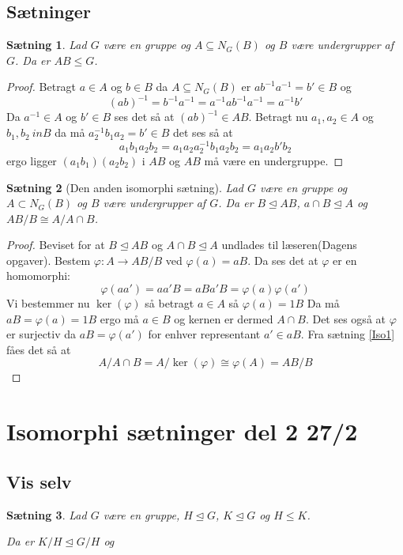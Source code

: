 \documentclass{article}
\newcommand{\inv}{^{-1}}
\newcommand{\too}{\rightarrow}
\newtheorem{setn}{Sætning}
\begin{document}
		\subsection*{Sætninger}
		\begin{setn}
			Lad $G$ være en gruppe og $A \subseteq N_G(B)$ og $B$ være undergrupper af $G$.
			Da er $AB \le G$.
		\end{setn}
		\begin{proof}
			Betragt $a \in A$ og $b \in B$ da $A \subseteq N_G(B)$ er $ab\inv a\inv = b' \in B$ og
			$$(ab)\inv = b\inv a\inv = a\inv a b \inv a \inv = a \inv b'$$
			Da $a\inv \in A$ og $b' \in B$ ses det så at $(ab)\inv \in AB$. Betragt nu
			$a_1, a_2 \in A$ og $b_1, b_2 \ in B$ da må $a_2\inv b_1 a_2 = b' \in B$ det ses så at
			$$a_1b_1a_2b_2 = a_1a_2a_2\inv b_1a_2b_2 = a_1a_2b'b_2$$
			ergo ligger $(a_1b_1)(a_2b_2)$ i $AB$ og $AB$ må være en undergruppe.
		\end{proof}
		\begin{setn}[Den anden isomorphi sætning]
			Lad $G$ være en gruppe og $A \subset N_G(B)$ og $B$ være undergrupper af $G$.
			Da er $B \unlhd AB$, $a\cap B \unlhd A$ og $AB/B \cong A/A\cap B$.
		\end{setn}
		\begin{proof}
			Beviset for at $B \unlhd AB$ og $A\cap B \unlhd A$ undlades til læseren(Dagens opgaver).
			Bestem $\varphi: A \too AB/B$ ved $\varphi(a) = aB$. Da ses det at $\varphi$ er en
			homomorphi:
			$$\varphi(aa') = aa'B = aBa'B = \varphi(a)\varphi(a')$$
			Vi bestemmer nu $\ker(\varphi)$ så betragt $a \in A$ så $\varphi(a) = 1B$
			Da må $aB = \varphi(a) = 1B$ ergo må $a \in B$ og kernen er dermed $A\cap B$.
			Det ses også at $\varphi$ er surjectiv da $aB = \varphi(a')$ for enhver representant
			$a' \in aB$. Fra sætning \ref{Iso1} fåes det så at
			$$A/A\cap B = A/\ker(\varphi) \cong \varphi(A) = AB/B$$
		\end{proof}
	\newpage
	\section*{Isomorphi sætninger del 2 27/2}
		\subsection*{Vis selv}
		\begin{setn}
			Lad $G$ være en gruppe, $H \unlhd G$, $K \unlhd G$ og $H \le K$.

			Da er $K/H \unlhd G/H$ og
		\end{setn}
\end{document}
